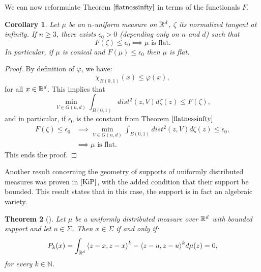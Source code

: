 \documentclass[11pt]{article}
\newtheorem{theorem}{Theorem}[section]
\newtheorem{corollary}[theorem]{Corollary}
\theoremstyle{definition}
\theoremstyle{remark}
\numberwithin{equation}{section}
\newcommand{\NN}{\mathbb{N}}
\begin{document}
We can now reformulate Theorem $\ref{flatnessinfty}$ in terms of the functionals $F$.

\begin{corollary}\label{functionalflatness}
Let $\mu$ be an $n$-uniform measure on $\mathbb{R}^{d}$, $\zeta$ its normalized tangent at infinity. If $n \geq 3$, there exists $\epsilon_{0}>0$ (depending only on $n$ and $d$) such that 
$$F(\zeta) \leq \epsilon_{0} \implies \mu \mbox{ is flat}.  $$
In particular, if $\mu$ is conical and $F(\mu) \leq \epsilon_{0}$ then $\mu$ is flat.
\end{corollary}
\begin{proof}
By definition of $\varphi$, we have: 
$$\chi_{B(0,1)}(x) \leq \varphi(x),$$
for all $x \in \mathbb{R}^{d}$.
This implies that
$$\min_{V \in G(n,d)} \int_{B(0,1)} dist^{2}(z,V) d\zeta(z)  \leq F(\zeta),$$
and in particular, if $\epsilon_{0}$ is the constant from Theorem $\ref{flatnessinfty}$
\begin{align*}
F(\zeta) \leq \epsilon_{0} & \implies \min_{V \in G(n,d)} \int_{B(0,1)} dist^{2}(z,V) d\zeta(z) \leq \epsilon_{0}, \\ & \implies \mu \mbox{ is flat. }
\end{align*}
This ends the proof.
\end{proof}


Another result concerning the geometry of supports of uniformly distributed measures was proven in $\cite{KiP}$, with the added condition that their support be bounded. This result states that in this case, the support is in fact an algebraic variety.
\begin{theorem}[\cite{KiP}]\label{boundedvariety}
Let $\mu$ be a uniformly distributed measure over $\mathbb{R}^{d}$ with bounded support and let $u \in \Sigma$. Then $x \in \Sigma$ if and only if:
\begin{equation}\label{boundedsupport} P_{k}(x)= \int_{\mathbb{R}^d} {\left\langle z-x, z-x \right\rangle}^{k} - {\left\langle z-u,z-u \right\rangle}^{k} d\mu(z)=0, 
\end{equation}
for every $k \in \NN$.
\end{theorem}
\end{document}

